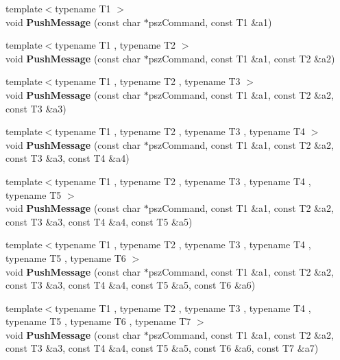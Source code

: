 \begin{DoxyCompactItemize}
{\footnotesize template$<$typename T1 $>$ }\\void {\bfseries Push\+Message} (const char $\ast$psz\+Command, const T1 \&a1)
\item 
\mbox{\label{class_c_node_a67b985781651b8806d7f9976f6fb85a9}} 
{\footnotesize template$<$typename T1 , typename T2 $>$ }\\void {\bfseries Push\+Message} (const char $\ast$psz\+Command, const T1 \&a1, const T2 \&a2)
\item 
\mbox{\label{class_c_node_a79355956a00c38d855b986a34e7ba444}} 
{\footnotesize template$<$typename T1 , typename T2 , typename T3 $>$ }\\void {\bfseries Push\+Message} (const char $\ast$psz\+Command, const T1 \&a1, const T2 \&a2, const T3 \&a3)
\item 
\mbox{\label{class_c_node_a2958ee10e2c96ef647787bce80196079}} 
{\footnotesize template$<$typename T1 , typename T2 , typename T3 , typename T4 $>$ }\\void {\bfseries Push\+Message} (const char $\ast$psz\+Command, const T1 \&a1, const T2 \&a2, const T3 \&a3, const T4 \&a4)
\item 
\mbox{\label{class_c_node_a1f58deeed29baf57c49dae177f8be826}} 
{\footnotesize template$<$typename T1 , typename T2 , typename T3 , typename T4 , typename T5 $>$ }\\void {\bfseries Push\+Message} (const char $\ast$psz\+Command, const T1 \&a1, const T2 \&a2, const T3 \&a3, const T4 \&a4, const T5 \&a5)
\item 
\mbox{\label{class_c_node_a4addbff355c502fb2f8c10451e76373d}} 
{\footnotesize template$<$typename T1 , typename T2 , typename T3 , typename T4 , typename T5 , typename T6 $>$ }\\void {\bfseries Push\+Message} (const char $\ast$psz\+Command, const T1 \&a1, const T2 \&a2, const T3 \&a3, const T4 \&a4, const T5 \&a5, const T6 \&a6)
\item 
\mbox{\label{class_c_node_ab3611cdb08d5f25a4da05fe140e48625}} 
{\footnotesize template$<$typename T1 , typename T2 , typename T3 , typename T4 , typename T5 , typename T6 , typename T7 $>$ }\\void {\bfseries Push\+Message} (const char $\ast$psz\+Command, const T1 \&a1, const T2 \&a2, const T3 \&a3, const T4 \&a4, const T5 \&a5, const T6 \&a6, const T7 \&a7)

\end{DoxyCompactItemize}
